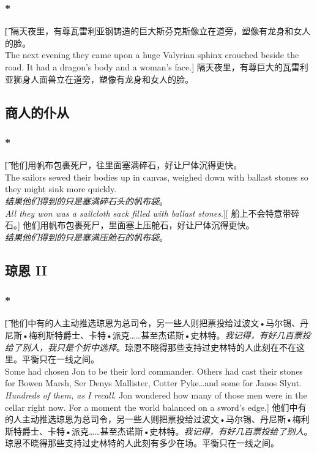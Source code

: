 \documentclass[12pt,a4paper]{article}
\begin{document}
\subsubsection{\color{red}*}\t[	
	隔天夜里，有尊瓦雷利亚钢铸造的巨大斯芬克斯像立在道旁，塑像有龙身和女人的脸。\\
	The next evening they came upon a huge Valyrian sphinx crouched beside the road. It had a dragon's body and a woman's face.]
	隔天夜里，有尊巨大的瓦雷利亚狮身人面兽立在道旁，塑像有龙身和女人的脸。
	
	
	
	
\subsection{商人的仆从}
\subsubsection{\color{red}*}\t[
	他们用帆布包裹死尸，往里面塞满碎石，好让尸体沉得更快。\\The sailors sewed their bodies up in canvas, weighed down with ballast stones so they might sink more quickly.\\
	\emph{结果他们得到的只是塞满碎石头的帆布袋}。\\
		\emph{All they won was a sailcloth sack filled with ballast stones}.][
	船上不会特意带碎石。]
	他们用帆布包裹死尸，里面塞上压舱石，好让尸体沉得更快。\\
	\emph{结果他们得到的只是塞满压舱石的帆布袋}。
	
\subsection{琼恩 II}
\subsubsection{\color{red}*}\t[
	他们中有的人主动推选琼恩为总司令，另一些人则把票投给过波文•马尔锡、丹尼斯•梅利斯特爵士、卡特•派克……甚至杰诺斯•史林特。\emph{我记得，有好几百票投给了别人，我只是个折中选择}。琼恩不晓得那些支持过史林特的人此刻在不在这里。平衡只在一线之间。\\
	Some had chosen Jon to be their lord commander. Others had cast their stones for Bowen Marsh, Ser Denys Mallister, Cotter Pyke\ldots and some for Janos Slynt. \emph{Hundreds of them, as I recall}. Jon wondered how many of those men were in the cellar right now. For a moment the world balanced on a sword's edge.]
	他们中有的人主动推选琼恩为总司令，另一些人则把票投给过波文•马尔锡、丹尼斯•梅利斯特爵士、卡特•派克……甚至杰诺斯•史林特。\emph{我记得，有好几百票投给了别人}。琼恩不晓得那些支持过史林特的人此刻有多少在场。平衡只在一线之间。
	
\end{document}
